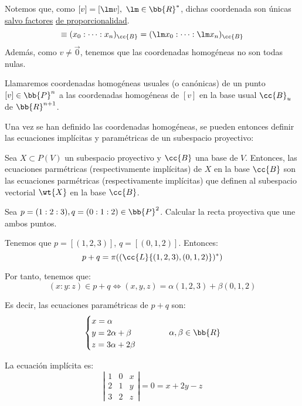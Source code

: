 Notemos que, como $[v]=[\lm v],~\lm \in \bb{R}^\ast$, dichas coordenada son únicas \ul{salvo factores} \ul{de proporcionalidad}.
\begin{equation*}
    [v] \equiv (x_0:\dots :x_n)_{\cc{B}}=(\lm x_0:\dots :\lm x_n)_{\cc{B}}
\end{equation*}
Además, como $v\neq \vec{0}$, tenemos que las coordenadas homogéneas no son todas nulas.

\begin{definicion}
    Llamaremos coordenadas homogéneas usuales (o canónicas) de un punto $[v]\in \bb{P}^n$ a las coordenadas homogéneas de $[v]$ en la base usual $\cc{B}_u$ de $\bb{R}^{n+1}$.
\end{definicion}


Una vez se han definido las coordenadas homogéneas, se pueden entonces definir las ecuaciones implícitas y paramétricas de un subespacio proyectivo:
\begin{definicion}
    Sea $X\subset P(V)$ un subespacio proyectivo y $\cc{B}$ una base de $V$.
    Entonces, las ecuaciones parmétricas (respectivamente implícitas) de $X$ en la base $\cc{B}$ son las ecuaciones parmétricas (respectivamente implícitas) que definen al subespacio vectorial $\wt{X}$ en la base $\cc{B}$.
\end{definicion}
\begin{ejemplo}
    Sea $p=(1:2:3), q=(0:1:2)\in \bb{P}^2$. Calcular la recta proyectiva que une ambos puntos.

    Tenemos que $p=[(1,2,3)]$, $q=[(0,1,2)]$. Entonces:
    \begin{equation*}
        p+q = \pi((\cc{L}\{(1,2,3), (0,1,2)\})^\ast)
    \end{equation*}

    Por tanto, tenemos que:
    \begin{equation*}
        (x:y:z)\in p+q \Longleftrightarrow (x,y,z)=\alpha(1,2,3) + \beta(0,1,2)
    \end{equation*}

    Es decir, las ecuaciones paramétricas de $p+q$ son:
    \begin{equation*}
        \begin{cases}
            x = \alpha\\
            y = 2\alpha + \beta\\
            z = 3\alpha + 2\beta
        \end{cases} \hspace{1cm} \alpha,\beta \in \bb{R}
    \end{equation*}

    La ecuación implícita es:
    \begin{equation*}
        \left|\begin{array}{ccc}
            1 & 0 & x \\
            2 & 1 & y\\
            3 & 2 & z
        \end{array}\right| = 0 = x+2y-z
    \end{equation*}
\end{ejemplo}


